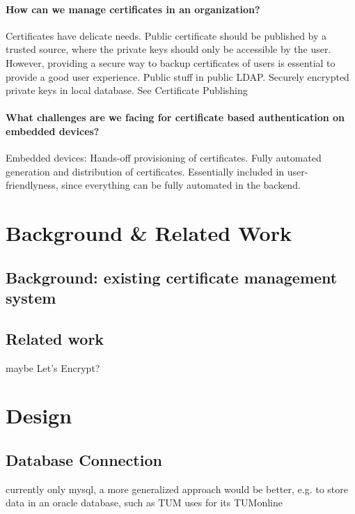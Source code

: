 \subsubsection*{How can we manage certificates in an organization?}
Certificates have delicate needs. Public certificate should be published by a trusted source, where the private keys
should only be accessible by the user. However, providing a secure way to backup certificates of users is essential to
provide a good user experience. Public stuff in public LDAP. Securely encrypted private keys in local database. See
Certificate Publishing

\subsubsection*{What challenges are we facing for certificate based authentication on embedded devices?}
Embedded devices: Hands-off provisioning of certificates. Fully automated generation and distribution of certificates.
Essentially included in user-friendlyness, since everything can be fully automated in the backend.


\chapter{Background \& Related Work}
\section{Background: existing certificate management system}

\section{Related work}
maybe Let's Encrypt?

\chapter{Design}

\section{Database Connection}
currently only mysql, a more generalized approach would be better, e.g. to store data in an oracle database, such as TUM
uses for its TUMonline

